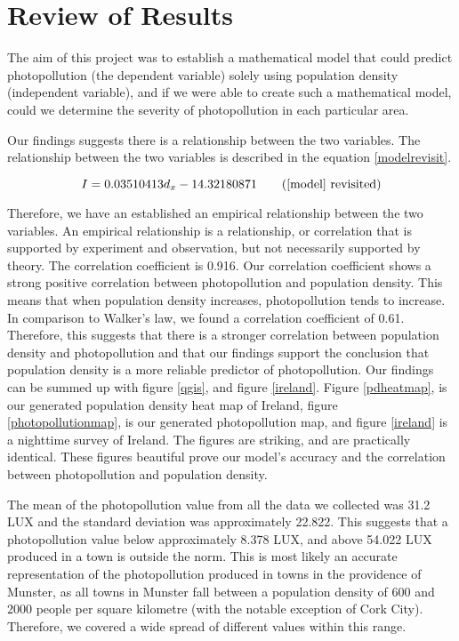 \section{Review of Results}
The aim of this project was to establish a mathematical model that could predict photopollution (the dependent variable) solely using population density (independent variable), and if we were able to create such a mathematical model, could we determine the severity of photopollution in each particular area.

Our findings suggests there is a relationship between the two variables. The relationship between the two variables is described in the equation \ref{modelrevisit}.

\begin{equation}
\label{modelrevisit}
    I = 0.03510413 d_x - 14.32180871 \tag{\ref{model} revisited}
\end{equation}

Therefore, we have an established an empirical relationship between the two variables. An empirical relationship is a relationship, or correlation that is supported by experiment and observation, but not necessarily supported by theory.\cite{empirical} The correlation coefficient is 0.916. Our correlation coefficient shows a strong positive correlation between photopollution and population density. This means that when population density increases, photopollution tends to increase. In comparison to Walker's law, we found a correlation coefficient of 0.61. Therefore, this suggests that there is a stronger correlation between population density and photopollution and that our findings support the conclusion that population density is a more reliable predictor of photopollution. Our findings can be summed up with figure \ref{qgis}, and figure \ref{ireland}. Figure \ref{pdheatmap}, is our generated population density heat map of Ireland, figure \ref{photopollutionmap}, is our generated photopollution map, and figure \ref{ireland} is a nighttime survey of Ireland. The figures are striking, and are practically identical. These figures beautiful prove our model's accuracy and the correlation between photopollution and population density. 

The mean of the photopollution value from all the data we collected was 31.2 LUX and the standard deviation was approximately 22.822. This suggests that a photopollution value below approximately 8.378 LUX, and above 54.022 LUX produced in a town is outside the norm. This is most likely an accurate representation of the photopollution produced in towns in the providence of Munster, as all towns in Munster fall between a population density of 600 and 2000 people per square kilometre (with the notable exception of Cork City). Therefore, we covered a wide spread of different values within this range. 

